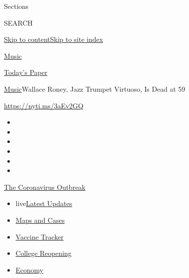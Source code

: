 Sections

SEARCH

\protect\hyperlink{site-content}{Skip to
content}\protect\hyperlink{site-index}{Skip to site index}

\href{https://www.nytimes.com/section/arts/music}{Music}

\href{https://myaccount.nytimes.com/auth/login?response_type=cookie\&client_id=vi}{}

\href{https://www.nytimes.com/section/todayspaper}{Today's Paper}

\href{/section/arts/music}{Music}\textbar{}Wallace Roney, Jazz Trumpet
Virtuoso, Is Dead at 59

\url{https://nyti.ms/3aEv2GQ}

\begin{itemize}
\item
\item
\item
\item
\item
\item
\end{itemize}

\href{https://www.nytimes.com/news-event/coronavirus?action=click\&pgtype=Article\&state=default\&region=TOP_BANNER\&context=storylines_menu}{The
Coronavirus Outbreak}

\begin{itemize}
\tightlist
\item
  live\href{https://www.nytimes.com/2020/08/03/world/coronavirus-covid-19.html?action=click\&pgtype=Article\&state=default\&region=TOP_BANNER\&context=storylines_menu}{Latest
  Updates}
\item
  \href{https://www.nytimes.com/interactive/2020/us/coronavirus-us-cases.html?action=click\&pgtype=Article\&state=default\&region=TOP_BANNER\&context=storylines_menu}{Maps
  and Cases}
\item
  \href{https://www.nytimes.com/interactive/2020/science/coronavirus-vaccine-tracker.html?action=click\&pgtype=Article\&state=default\&region=TOP_BANNER\&context=storylines_menu}{Vaccine
  Tracker}
\item
  \href{https://www.nytimes.com/2020/08/02/us/covid-college-reopening.html?action=click\&pgtype=Article\&state=default\&region=TOP_BANNER\&context=storylines_menu}{College
  Reopening}
\item
  \href{https://www.nytimes.com/live/2020/08/03/business/stock-market-today-coronavirus?action=click\&pgtype=Article\&state=default\&region=TOP_BANNER\&context=storylines_menu}{Economy}
\end{itemize}

